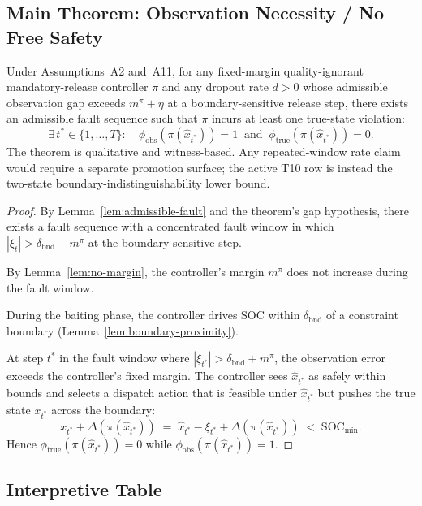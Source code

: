 \subsection{Main Theorem: Observation Necessity / No Free Safety}

\begin{theorem}
\label{thm:no-free-safety}
Under Assumptions~A2 and~A11, for any fixed-margin quality-ignorant
mandatory-release controller $\pi$ and any dropout rate $d > 0$ whose
admissible observation gap exceeds $m^\pi+\eta$ at a boundary-sensitive release
step, there exists an admissible fault sequence such that $\pi$ incurs at least
one true-state violation:
\[
  \exists\,t^* \in \{1, \ldots, T\} : \quad
  \phi_{\text{obs}}(\pi(\hat{x}_{t^*})) = 1 \;\;\text{and}\;\;
  \phi_{\text{true}}(\pi(\hat{x}_{t^*})) = 0.
\]
The theorem is qualitative and witness-based.  Any repeated-window rate claim
would require a separate promotion surface; the active T10 row is instead the
two-state boundary-indistinguishability lower bound.
\end{theorem}

\begin{proof}
By Lemma~\ref{lem:admissible-fault} and the theorem's gap hypothesis, there
exists a fault sequence with a concentrated fault window in which
$|\xi_t| > \delta_{\text{bnd}}+m^\pi$ at the boundary-sensitive step.

By Lemma~\ref{lem:no-margin}, the controller's margin $m^{\pi}$ does
not increase during the fault window.

During the baiting phase, the controller drives SOC within
$\delta_{\text{bnd}}$ of a constraint boundary
(Lemma~\ref{lem:boundary-proximity}).

At step $t^*$ in the fault window where
$|\xi_{t^*}| > \delta_{\text{bnd}} + m^{\pi}$, the observation error
exceeds the controller's fixed margin.  The controller sees
$\hat{x}_{t^*}$ as safely within bounds and selects a dispatch action
that is feasible under $\hat{x}_{t^*}$ but pushes the true state
$x_{t^*}$ across the boundary:
\[
  x_{t^*} + \Delta(\pi(\hat{x}_{t^*}))
  \;=\; \hat{x}_{t^*} - \xi_{t^*} + \Delta(\pi(\hat{x}_{t^*}))
  \;<\; \text{SOC}_{\min}.
\]
Hence $\phi_{\text{true}}(\pi(\hat{x}_{t^*})) = 0$ while
$\phi_{\text{obs}}(\pi(\hat{x}_{t^*})) = 1$.
\end{proof}

\subsection{Interpretive Table}

